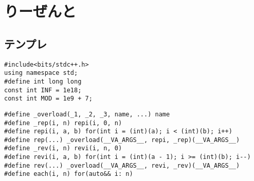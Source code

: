 \documentclass{jsarticle}
\begin{document}
\section*{りーぜんと}
\subsection*{テンプレ}
\begin{lstlisting}[caption=テンプレ]
#include<bits/stdc++.h>
using namespace std;
#define int long long
const int INF = 1e18;
const int MOD = 1e9 + 7;
\end{lstlisting}
\begin{lstlisting}[caption=ループ]
#define _overload(_1, _2, _3, name, ...) name
#define _rep(i, n) repi(i, 0, n)
#define repi(i, a, b) for(int i = (int)(a); i < (int)(b); i++)
#define rep(...) _overload(__VA_ARGS__, repi, _rep)(__VA_ARGS__)
#define _rev(i, n) revi(i, n, 0)
#define revi(i, a, b) for(int i = (int)(a - 1); i >= (int)(b); i--)
#define rev(...) _overload(__VA_ARGS__, revi, _rev)(__VA_ARGS__)
#define each(i, n) for(auto&& i: n)
\end{lstlisting}
\end{document}
